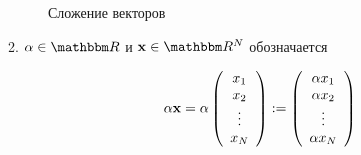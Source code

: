 \begin{frame}
    

\begin{figure}

  \begin{center}
   \caption{\label{f:vec_add} Сложение векторов}
  \end{center}
  
\end{figure}



\end{frame}


\begin{frame}
    
    2.  $\alpha \in \RR$ и $\boldx \in \RR^N$ обозначается
    
    \begin{equation*}
        \alpha {\mathbf x} 
        =
        \alpha \left(
        \begin{array}{c}
            x_1 \\
            x_2 \\
            \vdots \\
            x_N
        \end{array}
        \right)
        :=
        \left(
        \begin{array}{c}
            \alpha x_1 \\
            \alpha x_2 \\
            \vdots \\
            \alpha x_N
        \end{array}
        \right)
    \end{equation*}

\end{frame}



